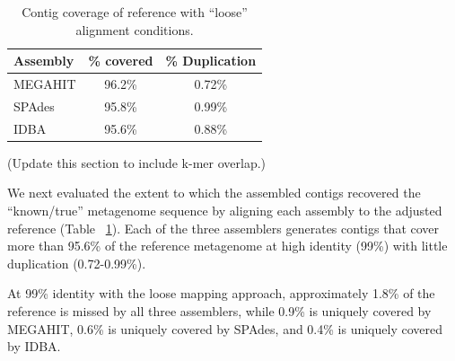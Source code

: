 \documentclass[10pt,a4paper,twocolumn]{article}
\begin{document}


\begin{table}[!h]
\centering
\caption{Contig coverage of reference with ``loose'' alignment conditions.}
\begin{tabular}{|l|c|c|}\hline
\textbf{Assembly} & \textbf{\% covered} & \textbf{\% Duplication}
  \\ \hline
MEGAHIT & 96.2\% & 0.72\% \\ \hline
SPAdes  & 95.8\% & 0.99\% \\ \hline
IDBA    & 95.6\% & 0.88\% \\ \hline
\end{tabular}
\label{table:contig-coverage}
\end{table}

(Update this section to include k-mer overlap.)


We next evaluated the extent to which the assembled contigs recovered the
``known/true'' metagenome sequence by aligning each assembly to the
adjusted reference (Table ~\ref{table:contig-coverage}).  Each of the three
assemblers generates contigs that cover more than 95.6\% of the reference
metagenome at high identity (99\%) with little duplication
(0.72-0.99\%).



At 99\% identity with the loose mapping approach, approximately 1.8\%
of the reference is missed by all three assemblers, while 0.9\% is
uniquely covered by MEGAHIT, 0.6\% is uniquely covered by SPAdes, and
0.4\% is uniquely covered by IDBA.

\end{document}
